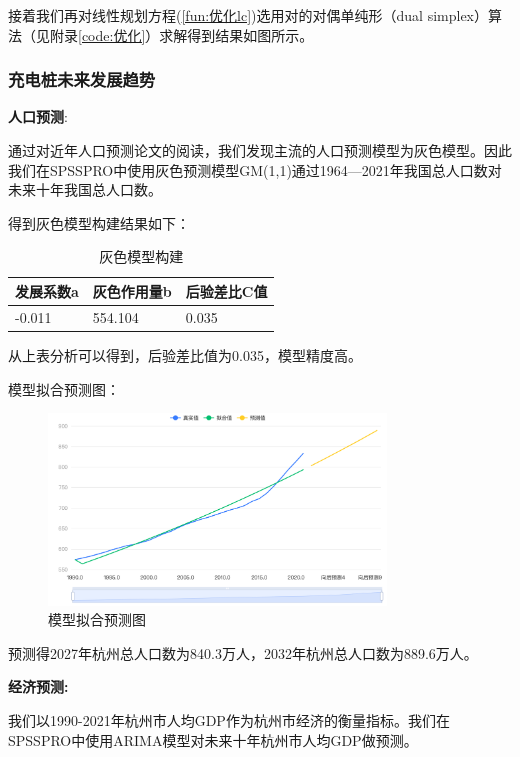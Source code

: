 \documentclass[12pt, a4paper, oneside]{ctexart}
\begin{document}
接着我们再对线性规划方程(\ref{fun:优化lc})选用对的对偶单纯形（dual simplex）算法（见附录\ref{code:优化}）求解得到结果如图所示。

\subsubsection{充电桩未来发展趋势}

\textbf{人口预测}:

通过对近年人口预测论文的阅读，我们发现主流的人口预测模型为灰色模型。因此我们在SPSSPRO中使用灰色预测模型GM(1,1)通过1964---2021年我国总人口数对未来十年我国总人口数。

得到灰色模型构建结果如下：

\begin{table}[H]
  \centering
  \begin{tabularx}{0.9\textwidth}{XXX}
  \toprule
  发展系数a & 灰色作用量b & 后验差比C值 \\
  \midrule
  -0.011 & 554.104 & 0.035 \\
  \bottomrule
  \end{tabularx}
  \caption{灰色模型构建}
  \label{tab:grey}
\end{table}

从上表分析可以得到，后验差比值为0.035，模型精度高。

模型拟合预测图：
\begin{figure}[H]
  \centering
  \includegraphics[width=0.8\textwidth]{pic/模型拟合预测图.png}
  \caption{模型拟合预测图}
  \label{fig:模型拟合预测图}
\end{figure}



预测得2027年杭州总人口数为840.3万人，2032年杭州总人口数为889.6万人。

\textbf{经济预测:}

我们以1990-2021年杭州市人均GDP作为杭州市经济的衡量指标。我们在SPSSPRO中使用ARIMA模型对未来十年杭州市人均GDP做预测。
\end{document}
